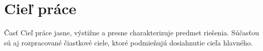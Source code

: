 \chapter{Cieľ práce}
Časť Cieľ práce jasne, výstižne a presne charakterizuje predmet riešenia. Súčasťou sú aj rozpracované čiastkové ciele, ktoré podmieňujú dosiahnutie cieľa hlavného.



